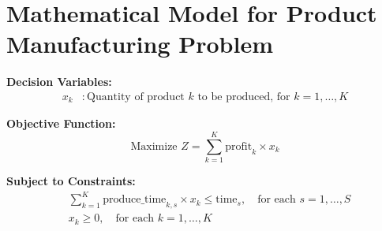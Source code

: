 \documentclass{article}
\begin{document}
\section*{Mathematical Model for Product Manufacturing Problem}

\textbf{Decision Variables:}
\begin{align*}
x_k &: \text{Quantity of product } k \text{ to be produced, for } k = 1, \ldots, K
\end{align*}

\textbf{Objective Function:}
\[
\text{Maximize } Z = \sum_{k=1}^{K} \text{profit}_k \times x_k
\]

\textbf{Subject to Constraints:}
\begin{align*}
& \sum_{k=1}^{K} \text{produce\_time}_{k, s} \times x_k \leq \text{time}_s, \quad \text{for each } s = 1, \ldots, S \\
& x_k \geq 0, \quad \text{for each } k = 1, \ldots, K
\end{align*}
\end{document}

